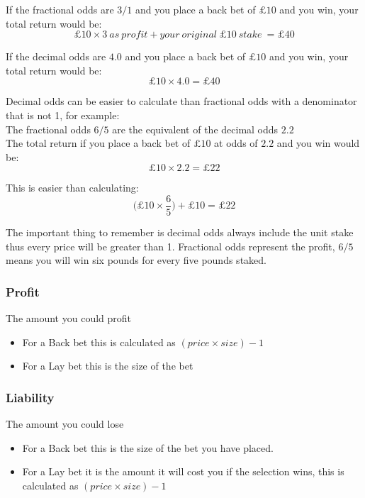 		If the fractional odds are $3/1$ and you place a back bet of $\pounds10$ and you win, your total return would be: 
		$$\pounds10 \times 3\ as\ profit + your\ original\ \pounds10\ stake\ = \pounds40$$

		If the decimal odds are $4.0$ and you place a back bet of $\pounds10$ and you win, your total return would be: 
		$$\pounds10 \times 4.0 = \pounds40$$

		Decimal odds can be easier to calculate than fractional odds with a denominator that is not 1, for example:\\

		The fractional odds $6/5$ are the equivalent of the decimal odds $2.2$\\

		The total return if you place a back bet of $\pounds10$ at odds of $2.2$ and you win would be: 
		$$\pounds10 \times 2.2 = \pounds22$$ 
		
		This is easier than calculating:
		$$\Big(\pounds10 \times \frac{6}{5}\Big) + \pounds10 = \pounds22$$

		The important thing to remember is decimal odds always include the unit stake thus every price will be greater than 1. Fractional odds represent the profit, $6/5$ means you will win six pounds for every five pounds staked. 

		\subsubsection{Profit}
		The amount you could profit
			\begin{itemize}
				\item For a Back bet this is calculated as $(price \times size) - 1$
				\item For a Lay bet this is the size of the bet
			\end{itemize}

		\subsubsection{Liability}
		The amount you could lose
			\begin{itemize}
				\item For a Back bet this is the size of the bet you have placed.
				\item For a Lay bet it is the amount it will cost you if the selection wins, this is calculated as $(price \times size) - 1$  			
			\end{itemize}
			
